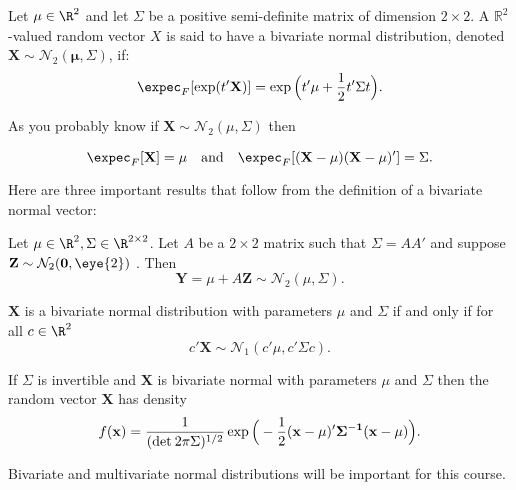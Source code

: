 \documentclass[11pt]{article} %
\begin{document}
\begin{definition}
Let $\mu \in \R^2$ and let $\Sigma$ be a positive semi-definite matrix of dimension $2 \times 2$. A $\mathbb{R}^2$-valued random vector $X$ is said to have a bivariate normal distribution, denoted $\mathbf{X} \sim \mathcal{N}_{2}(\mathbf{\mu}, \Sigma)$, if:
$$ \expec_{F}[\exp(t'\mathbf{X})]= \exp\Big(t'\mu + \frac{1}{2} t'\Sigma t \Big).$$
\end{definition}

\noindent As you probably know if $\mathbf{X} \sim \mathcal{N}_2(\mu, \Sigma)$ then

$$\expec_{F}[\mathbf{X}]= \mu \quad \text{and} \quad \expec_{F}[ (\mathbf{X}-\mathbf{\mu})(\mathbf{X}-\mathbf{\mu})' ]=\Sigma.$$

\noindent Here are three important results that follow from the definition of a bivariate normal vector:

\begin{result}
Let $\mu \in \R^2, \Sigma \in \R^{2 \times 2}$. Let $A$ be a $2 \times 2$ matrix such that $\Sigma=AA'$ and suppose $\mathbf{Z} \sim \mathcal{N}_2(\textbf{0}, \eye{2})$ . Then
$$\mathbf{Y} = \mu + A \textbf{Z} \sim \mathcal{N}_2(\mu, \Sigma).$$
\end{result}


\begin{result}  $\mathbf{X}$ is a bivariate normal distribution with parameters $\mu$ and $\Sigma$ if and only if for all $c \in \R^2$
$$ c'\mathbf{X} \sim \mathcal{N}_1(c'\mu, c'\Sigma c).$$

\end{result}

\begin{result}
If $\Sigma$ is invertible and $\mathbf{X}$ is bivariate normal with parameters $\mu$ and $\Sigma$ then the random vector $\mathbf{X}$ has density
$$ f(\mathbf{x}) = \frac{1}{ (\text{det}\: 2\pi \Sigma)^{1/2} } \exp \Big( -\frac{1}{2} (\bf{x}-\mu)'\Sigma^{-1} (\bf{x}-\mu) \Big).$$
\end{result}

Bivariate and multivariate normal distributions will be important for this course. 
\end{document}
